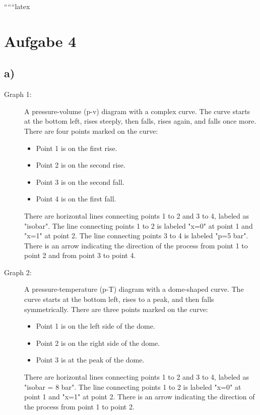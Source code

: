 
``````latex


\section*{Aufgabe 4}

\subsection*{a)}

\begin{description}
    \item[Graph 1:] A pressure-volume (p-v) diagram with a complex curve. The curve starts at the bottom left, rises steeply, then falls, rises again, and falls once more. There are four points marked on the curve: 
    \begin{itemize}
        \item Point 1 is on the first rise.
        \item Point 2 is on the second rise.
        \item Point 3 is on the second fall.
        \item Point 4 is on the first fall.
    \end{itemize}
    There are horizontal lines connecting points 1 to 2 and 3 to 4, labeled as "isobar". The line connecting points 1 to 2 is labeled "x=0" at point 1 and "x=1" at point 2. The line connecting points 3 to 4 is labeled "p=5 bar". There is an arrow indicating the direction of the process from point 1 to point 2 and from point 3 to point 4.

    \item[Graph 2:] A pressure-temperature (p-T) diagram with a dome-shaped curve. The curve starts at the bottom left, rises to a peak, and then falls symmetrically. There are three points marked on the curve:
    \begin{itemize}
        \item Point 1 is on the left side of the dome.
        \item Point 2 is on the right side of the dome.
        \item Point 3 is at the peak of the dome.
    \end{itemize}
    There are horizontal lines connecting points 1 to 2 and 3 to 4, labeled as "isobar = 8 bar". The line connecting points 1 to 2 is labeled "x=0" at point 1 and "x=1" at point 2. There is an arrow indicating the direction of the process from point 1 to point 2.
\end{description}

